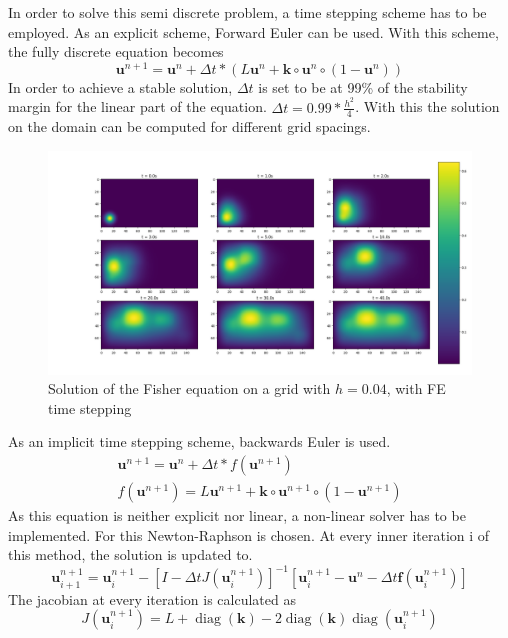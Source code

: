 \documentclass{article}
\begin{document}
In order to solve this semi discrete problem, a time stepping scheme has to be employed. As an explicit scheme, Forward Euler can be used. With this scheme, the fully discrete equation becomes
\begin{equation}
\mathbf{u}^{n+1} = \mathbf{u}^n+\Delta t*\left(L \mathbf{u}^n + \mathbf{k}\circ\mathbf{u}^n\circ\left(1-\mathbf{u}^n\right)\right)
\end{equation}
In order to achieve a stable solution, $\Delta t$ is set to be at 99\% of the stability margin for the linear part of the equation. $\Delta t = 0.99*\frac{h^2}{4}$. With this the solution on the domain can be computed for different grid spacings.
\begin{figure}[H]
	\centering
	\includegraphics[width=.9\linewidth]{4FE.png}
	\caption{Solution of the Fisher equation on a grid with $h=0.04$, with FE time stepping}
\end{figure}
As an implicit time stepping scheme, backwards Euler is used.
\begin{align}
\mathbf{u}^{n+1} = \mathbf{u}^n+\Delta t*f(\mathbf{u}^{n+1})\\
f(\mathbf{u}^{n+1})=L \mathbf{u}^{n+1} + \mathbf{k}\circ\mathbf{u}^{n+1}\circ\left(1-\mathbf{u}^{n+1}\right)
\end{align}
As this equation is neither explicit nor linear, a non-linear solver has to be implemented. For this Newton-Raphson is chosen. At every inner iteration i of this method, the solution is updated to.
\begin{equation}
\mathbf{u}_{i+1}^{n+1}=\mathbf{u}_{i}^{n+1}-\left[I-\Delta t J\left(\mathbf{u}_{i}^{n+1}\right)\right]^{-1}\left[\mathbf{u}_{i}^{n+1}-\mathbf{u}^{n}-\Delta t \mathbf{f}\left(\mathbf{u}_{i}^{n+1}\right)\right]
\end{equation}
The jacobian at every iteration is calculated as
\begin{equation}
J\left(\mathbf{u}_{i}^{n+1}\right)=L+\operatorname{diag}(\mathbf{k})-2 \operatorname{diag}(\mathbf{k})\operatorname{diag}(\mathbf{u}_{i}^{n+1})
\end{equation}
\end{document}
